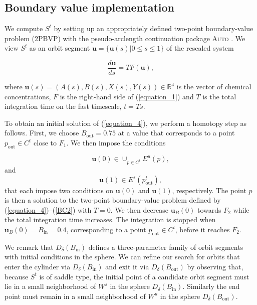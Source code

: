 \documentclass{ws-ijbc}
\begin{document}
\subsection{Boundary value implementation}
    
We compute $S^t$ by setting up an appropriately defined two-point boundary-value problem (2PBVP) with the pseudo-arclength continuation package \textsc{Auto} \cite{AUTO}.  We view $S^t$ as an orbit segment $\mathbf{u} = \{\mathbf{u}(s)| 0 \leq s \leq 1 \}$ of the rescaled system


\begin{equation}
\frac{d\mathbf{u}}{ds} = TF(\mathbf{u}),
\label{equation_4}
\end{equation}
    
\noindent
where $\mathbf{u}(s) = (A(s), B(s), X(s), Y(s)) \in \mathbb{R}^4$ is the vector of chemical concentrations, $F$ is the right-hand side of (\ref{equation_1}) and $T$ is the total integration time on the fast timescale, $t=Ts$.
    
To obtain an initial solution of (\ref{equation_4}), we perform a homotopy step as follows.  First, we choose $B_{\mathrm{out}} = 0.75$ at a value that corresponds to a point $p_{\mathrm{out}} \in C^t$ close to $F_1$.  We then impose the conditions
    
\begin{equation}
\mathbf{u}(0) \in \cup_{p \in C^t} E^u(p),
\label{BC3}
\end{equation}
and
\begin{equation}
\mathbf{u}(1) \in E^s(p^t_{\mathrm{out}}),
\label{BC2}
\end{equation}
\noindent
that each impose two conditions on $\mathbf{u}(0)$ and $\mathbf{u}(1)$, respectively.  The point $p$ is then a solution to the two-point boundary-value problem defined by (\ref{equation_4})--(\ref{BC2}) with $T=0$.  We then  decrease $\mathbf{u}_B(0)$ towards $F_2$ while the total integration time increases.  The integration is stopped when $\mathbf{u}_B(0)=B_{\text{in}}=0.4$, corresponding to a point $p_{\text{out}} \in C^t$, before it reaches $F_2$.
    
We remark that $D_\delta(B_{\mathrm{in}})$ defines a three-parameter family of orbit segments with initial conditions in the sphere.  We can refine our search for orbits that enter the cylinder via $D_\delta(B_{\mathrm{in}})$ and exit it via $D_\delta(B_{\mathrm{out}})$ by observing that, because $S^t$ is of saddle type, the initial point of a candidate orbit segment must lie in a small neighborhood of $W^s$ in the sphere $D_\delta(B_{\mathrm{in}})$.  Similarly the end point must remain in a small neighborhood of $W^u$ in the sphere $D_\delta(B_{\mathrm{out}})$.
    
\end{document}
